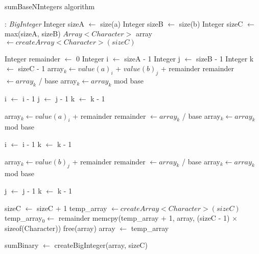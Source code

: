 \documentclass[book, nodocumentinfo]{upmethodology-document}
\begin{document}
\begin{algorithm}[H]
    \caption{sumBaseNIntegers algorithm}
    \label{algo:basenintegerlist-sum-basen-integers}

    \begin{algorithmic}
         : \emph{BigInteger}
            \State Integer sizeA \(\leftarrow\) size(a)
            \State Integer sizeB \(\leftarrow\) size(b)
            \State Integer sizeC \(\leftarrow\) max(sizeA, sizeB)
            \State \(Array<Character>\) array \(\leftarrow createArray<Character>(sizeC)\)

            \State Integer remainder \(\leftarrow\) 0
            \State Integer i \(\leftarrow\) sizeA - 1
            \State Integer j \(\leftarrow\) sizeB - 1
            \State Integer k \(\leftarrow\) sizeC - 1
                \State array\(_k \leftarrow value(a)_i\) + \(value(b)_j\) + remainder
                \State remainder \(\leftarrow array_k\) / base
                \State array\(_k \leftarrow array_k\) mod base

                \State i \(\leftarrow\) i - 1
                \State j \(\leftarrow\) j - 1
                \State k \(\leftarrow\) k - 1
            \EndWhile

                \State array\(_k \leftarrow value(a)_i\) + remainder
                \State remainder \(\leftarrow array_k\) / base
                \State array\(_k \leftarrow array_k\) mod base

                \State i \(\leftarrow\) i - 1
                \State k \(\leftarrow\) k - 1
            \EndWhile

                \State array\(_k \leftarrow value(b)_j\) + remainder
                \State remainder \(\leftarrow array_k\) / base
                \State array\(_k \leftarrow array_k\) mod base

                \State j \(\leftarrow\) j - 1
                \State k \(\leftarrow\) k - 1
            \EndWhile

                \State sizeC \(\leftarrow\) sizeC + 1
                \State temp\_array \(\leftarrow createArray<Character>(sizeC)\)
                \State temp\_array\(_0 \leftarrow\) remainder
                \State memcpy(temp\_array + 1, array, (sizeC - 1) \(×\) sizeof(Character))
                \State free(array)
                \State array \(\leftarrow\) temp\_array
            \EndIf

            \State sumBinary \(\leftarrow\) createBigInteger(array, sizeC)
        \EndFunction
    \end{algorithmic}
\end{algorithm}
\end{document}
